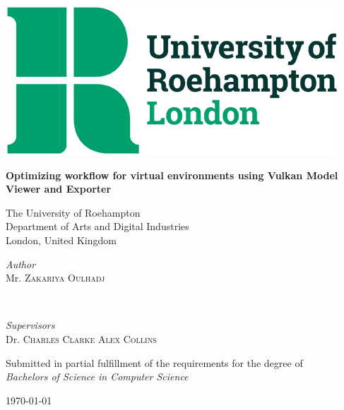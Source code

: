 \documentclass[11pt]{article}
\begin{document}

\begin{titlepage}
	\centering
  \includegraphics[scale=0.35]{images/university-logo.png}\par
  \vspace{1cm}
	{\huge\textbf{Optimizing workflow for virtual environments using Vulkan Model Viewer and Exporter}\par}
  \vspace{1cm}
  The University of Roehampton\\
  Department of Arts and Digital Industries\\
  London, United Kingdom
  \vspace{1cm}
  \vfill
  \begin{minipage}[t]{0.4\textwidth}
		\begin{flushleft}
			\large
			\textit{Author}\\
			Mr. \textsc{Zakariya Oulhadj} %
		\end{flushleft}
	\end{minipage}
	~
	\begin{minipage}[t]{0.4\textwidth}
		\begin{flushright}
			\large
			\textit{Supervisors}\\
			Dr. \textsc{Charles Clarke} %
      \textsc{Alex Collins} %
		\end{flushright}
	\end{minipage}

  \vfill
  Submitted in partial fulfillment of the requirements for the degree of \\
  \textit{Bachelors of Science in Computer Science}
  \vfill
	{\large \today\par}
\end{titlepage}
\end{document}
